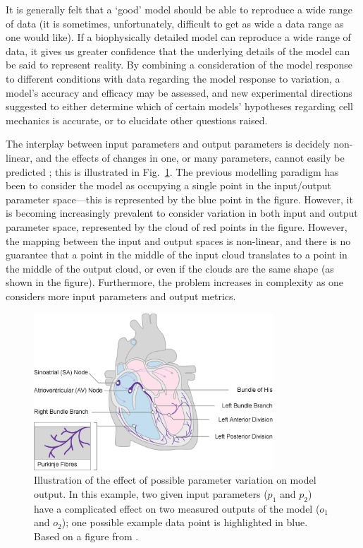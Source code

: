 \documentclass[../thesis-main.tex]{subfiles}
\begin{document}
 It is generally felt that a `good' model should be able to reproduce a wide range of data (it is sometimes, unfortunately, difficult to get as wide a data range as one would like). If a biophysically detailed model can reproduce a wide range of data, it gives us greater confidence that the underlying details of the model can be said to represent reality. By combining a consideration of the model response to different conditions with data regarding the model response to variation, a model's accuracy and efficacy may be assessed, and new experimental directions suggested to either determine which of certain models' hypotheses regarding cell mechanics is accurate, or to elucidate other questions raised.
 
 The interplay between input parameters and output parameters is decidely non-linear, and the effects of changes in one, or many parameters, cannot easily be predicted \citep{Sarkar2012}; this is illustrated in Fig.~\ref{fig:param-var-effect}. The previous modelling paradigm has been to consider the model as occupying a single point in the input/output parameter space---this is represented by the blue point in the figure. However, it is becoming increasingly prevalent to consider variation in both input and output parameter space, represented by the cloud of red points in the figure. However, the mapping between the input and output spaces is non-linear, and there is no guarantee that a point in the middle of the input cloud translates to a point in the middle of the output cloud, or even if the clouds are the same shape (as shown in the figure). Furthermore, the problem increases in complexity as one considers more input parameters and output metrics.
 \begin{figure}
  \centering
  \includegraphics[width=0.8\textwidth]{cardiac_conduction}
  \caption[Effect of parameter variation on model output.]{Illustration of the effect of possible parameter variation on model output. In this example, two given input parameters ($p_1$ and $p_2$) have a complicated effect on two measured outputs of the model ($o_1$ and $o_2$); one possible example data point is highlighted in blue. Based on a figure from \citet{Sarkar2012}.}
  \label{fig:param-var-effect}
 \end{figure}
 
\end{document}

